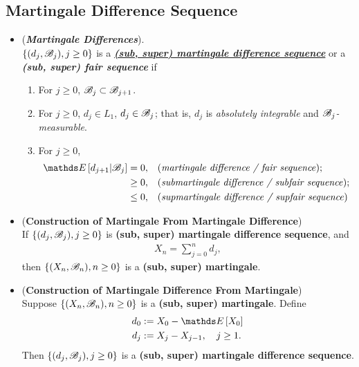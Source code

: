 \documentclass[11pt]{article}
\begin{document}
\subsection{Martingale Difference Sequence}
\begin{itemize}
\item \begin{definition} (\textbf{\emph{Martingale Differences}}).  \citep{resnick2013probability}\\
$\left\{(d_j, {\mathscr B}_j), j \ge 0\right\}$ is a \underline{\emph{\textbf{(sub, super) martingale difference sequence}}} or a \textit{\textbf{(sub, super) fair sequence}} if
\begin{enumerate}
\item For $j \ge 0$,  ${\mathscr B}_j \subset {\mathscr B}_{j+1}$.
\item For $j \ge 0$,  $d_j \in L_1$,  $d_j \in {\mathscr B}_j$; that is, $d_j$ is \emph{absolutely integrable} and \emph{${\mathscr B}_j$-measurable}.
\item For $j \ge 0$,
\begin{align*}
\E{}{d_{j+1} | \srB_j} &= 0, && \text{(\emph{martingale difference / fair sequence})};\\
& \ge 0, && \text{(\emph{submartingale difference / subfair sequence})};\\
& \le 0, && \text{(\emph{supmartingale difference / supfair sequence})}
\end{align*}
\end{enumerate}
\end{definition}

\item \begin{theorem} (\textbf{Construction of Martingale From Martingale Difference})\citep{resnick2013probability}\\
If $\left\{(d_j, {\mathscr B}_j), j \ge 0\right\}$ is \textbf{(sub, super) martingale difference sequence}, and
\begin{align*}
X_n = \sum_{j=0}^{n} d_j, 
\end{align*} then $\left\{(X_n, {\mathscr B}_n), n \ge 0\right\}$ is a \textbf{(sub, super) martingale}.
\end{theorem}

\item \begin{theorem} (\textbf{Construction of Martingale Difference From Martingale}) \citep{resnick2013probability}\\
Suppose $\left\{(X_n, {\mathscr B}_n), n \ge 0\right\}$ is a \textbf{(sub, super) martingale}. Define
\begin{align*}
d_0&:= X_0 - \E{}{X_0}\\
d_j &:= X_j - X_{j-1}, \quad j\ge 1.
\end{align*}
Then $\left\{(d_j, {\mathscr B}_j), j \ge 0\right\}$ is a \textbf{(sub, super) martingale difference sequence}.
\end{theorem}


\end{itemize}
\end{document}
